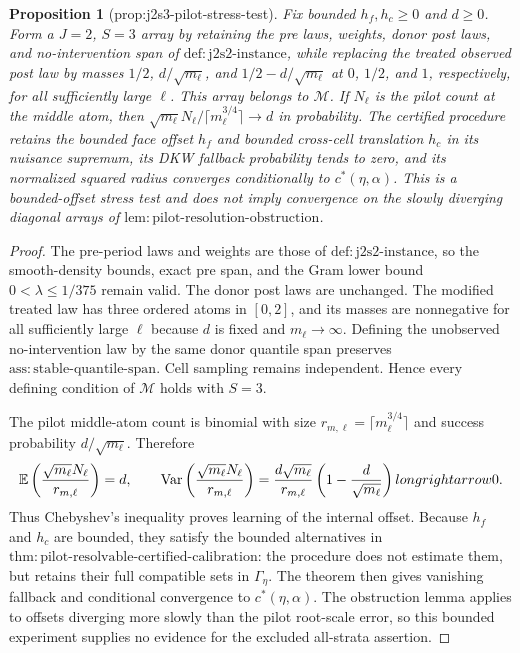 \documentclass{article}
\newtheorem{proposition}{Proposition}
\begin{document}
\begin{proposition}[prop:j2s3-pilot-stress-test]\label{prop:j2s3-pilot-stress-test}
Fix bounded \(h_f,h_c\geq0\) and \(d\geq0\).  Form a \(J=2\), \(S=3\) array by retaining the pre laws, weights, donor post laws, and no-intervention span of \(\mathrm{def:j2s2\mbox{-}instance}\), while replacing the treated observed post law by masses \(1/2\), \(d/\sqrt{m_\ell}\), and \(1/2-d/\sqrt{m_\ell}\) at \(0\), \(1/2\), and \(1\), respectively, for all sufficiently large \(\ell\).  This array belongs to \(\mathcal M\).  If \(N_\ell\) is the pilot count at the middle atom, then \(\sqrt{m_\ell}N_\ell/\lceil m_\ell^{3/4}\rceil\to d\) in probability.  The certified procedure retains the bounded face offset \(h_f\) and bounded cross-cell translation \(h_c\) in its nuisance supremum, its DKW fallback probability tends to zero, and its normalized squared radius converges conditionally to \(c^*(\eta,\alpha)\).  This is a bounded-offset stress test and does not imply convergence on the slowly diverging diagonal arrays of \(\mathrm{lem:pilot\mbox{-}resolution\mbox{-}obstruction}\).
\end{proposition}
\begin{proof}
The pre-period laws and weights are those of \(\mathrm{def:j2s2\mbox{-}instance}\), so the smooth-density bounds, exact pre span, and the Gram lower bound \(0<\lambda\leq1/375\) remain valid.  The donor post laws are unchanged.  The modified treated law has three ordered atoms in \([0,2]\), and its masses are nonnegative for all sufficiently large \(\ell\) because \(d\) is fixed and \(m_\ell\to\infty\).  Defining the unobserved no-intervention law by the same donor quantile span preserves \(\mathrm{ass:stable\mbox{-}quantile\mbox{-}span}\).  Cell sampling remains independent.  Hence every defining condition of \(\mathcal M\) holds with \(S=3\).

The pilot middle-atom count is binomial with size
\(r_{m,\ell}=\lceil m_\ell^{3/4}\rceil\) and success probability \(d/\sqrt{m_\ell}\).  Therefore
\[
 \mathbb E\left(\frac{\sqrt{m_\ell}N_\ell}{r_{m,\ell}}\right)=d,
 \qquad
 \operatorname{Var}\left(\frac{\sqrt{m_\ell}N_\ell}{r_{m,\ell}}\right)
 =\frac{d\sqrt{m_\ell}}{r_{m,\ell}}
   \left(1-\frac d{\sqrt{m_\ell}}\right)\\longrightarrow0.
\]
Thus Chebyshev's inequality proves learning of the internal offset.  Because \(h_f\) and \(h_c\) are bounded, they satisfy the bounded alternatives in
\(\mathrm{thm:pilot\mbox{-}resolvable\mbox{-}certified\mbox{-}calibration}\): the procedure does not estimate them, but retains their full compatible sets in \(\Gamma_\eta\).  The theorem then gives vanishing fallback and conditional convergence to \(c^*(\eta,\alpha)\).  The obstruction lemma applies to offsets diverging more slowly than the pilot root-scale error, so this bounded experiment supplies no evidence for the excluded all-strata assertion.
\end{proof}
\end{document}
